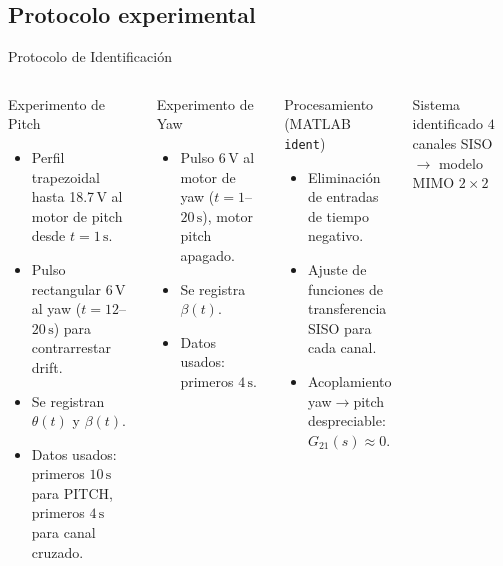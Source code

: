 \documentclass[mathserif,spanish,10pt]{beamer}
\begin{document}
\subsection{Protocolo experimental}

\begin{frame}{Protocolo de Identificación}
\begin{columns}[T]
  \begin{block}{Experimento de Pitch}
    \begin{itemize}
      \item Perfil trapezoidal hasta 18.7\,V al motor de pitch desde $t=1\,\text{s}$.
      \item Pulso rectangular 6\,V al yaw ($t=12$--$20\,\text{s}$) para contrarrestar drift.
      \item Se registran $\theta(t)$ y $\beta(t)$.
      \item Datos usados: primeros $10\,\text{s}$ para PITCH, primeros $4\,\text{s}$ para canal cruzado.
    \end{itemize}
  \end{block}

  \begin{block}{Experimento de Yaw}
    \begin{itemize}
      \item Pulso 6\,V al motor de yaw ($t=1$--$20\,\text{s}$), motor pitch apagado.
      \item Se registra $\beta(t)$.
      \item Datos usados: primeros $4\,\text{s}$.
    \end{itemize}
  \end{block}

  \begin{block}{Procesamiento (MATLAB \texttt{ident})}
    \begin{itemize}
      \item Eliminación de entradas de tiempo negativo.
      \item Ajuste de funciones de transferencia SISO para cada canal.
      \item Acoplamiento yaw$\to$pitch despreciable: $G_{21}(s)\approx 0$.
    \end{itemize}
  \end{block}

  \begin{alertblock}{Sistema identificado}
    \centering
    $4$ canales SISO $\to$ modelo MIMO $2\times2$
  \end{alertblock}
\end{columns}
\end{frame}
\end{document}
